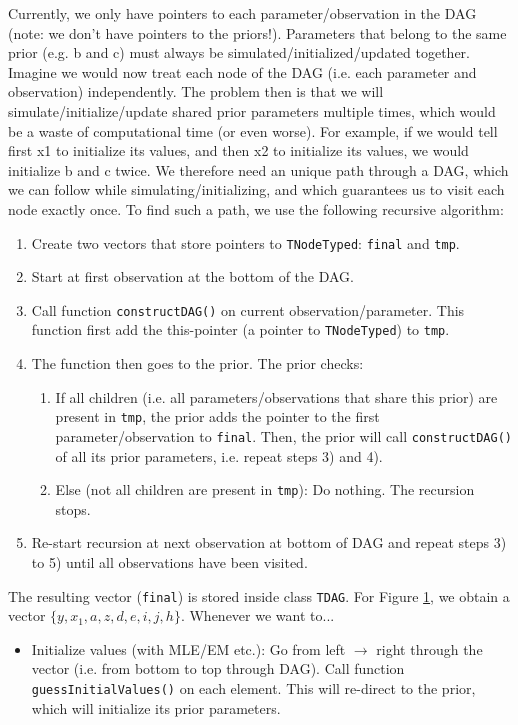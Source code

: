 \documentclass[a4paper,11pt]{article}
\newcommand{\class}[1]{\texttt{#1}}
\newcommand{\pubfunc}[1]{\texttt{#1()}}
\begin{document}
\begin{itemize}
\begin{itemize}
\begin{figure}[t]
\label{fig:DAG}
\end{figure}
Currently, we only have pointers to each parameter/observation in the DAG (note: we don't have pointers to the priors!). Parameters that belong to the same prior (e.g. b and c) must always be simulated/initialized/updated together. Imagine we would now treat each node of the DAG (i.e. each parameter and observation) independently. The problem then is that we will simulate/initialize/update shared prior parameters multiple times, which would be a waste of computational time (or even worse). For example, if we would tell first x1 to initialize its values, and then x2 to initialize its values, we would initialize b and c twice. We therefore need an unique path through a DAG, which we can follow while simulating/initializing, and which guarantees us to visit each node exactly once. To find such a path, we use the following recursive algorithm:
\begin{enumerate}
\item Create two vectors that store pointers to \class{TNodeTyped}: \texttt{final} and \texttt{tmp}.
 \item Start at first observation at the bottom of the DAG.
 \item Call function \pubfunc{constructDAG} on current observation/parameter. This function first add the this-pointer (a pointer to \class{TNodeTyped}) to \texttt{tmp}.
 \item The function then goes to the prior. The prior checks:
 \begin{enumerate}
  \item If all children (i.e. all parameters/observations that share this prior) are present in \texttt{tmp}, the prior adds the pointer to the first parameter/observation to \texttt{final}. Then, the prior will call \pubfunc{constructDAG} of all its prior parameters, i.e. repeat steps 3) and 4).
  \item Else (not all children are present in \texttt{tmp}): Do nothing. The recursion stops.
 \end{enumerate}
 \item Re-start recursion at next observation at bottom of DAG and repeat steps 3) to 5) until all observations have been visited.
\end{enumerate}
The resulting vector (\texttt{final}) is stored inside class \class{TDAG}. For Figure \ref{fig:DAG}, we obtain a vector $\{y, x_1, a, z, d, e, i, j, h\}$. Whenever we want to...
\begin{itemize}
 \item Initialize values (with MLE/EM etc.): Go from left $\to$ right through the vector (i.e. from bottom to top through DAG). Call function \pubfunc{guessInitialValues} on each element. This will re-direct to the prior, which will initialize its prior parameters.

\end{itemize}
\end{itemize}
\end{itemize}
\end{document}
